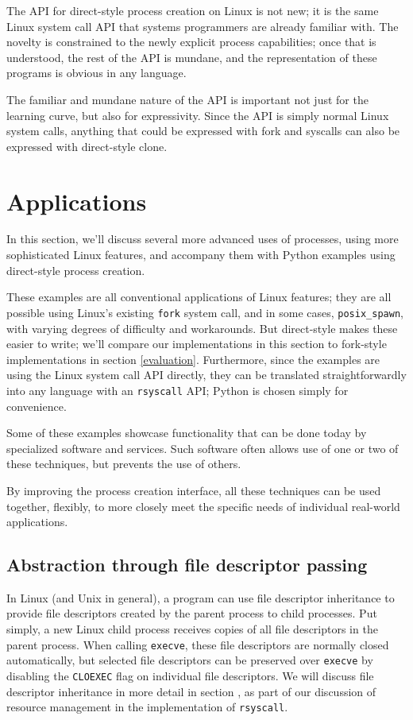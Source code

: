 \documentclass{acmart}
\begin{document}
The API for direct-style process creation on Linux is not new;
it is the same Linux system call API that systems programmers are already familiar with.
The novelty is constrained to the newly explicit process capabilities;
once that is understood, the rest of the API is mundane,
and the representation of these programs is obvious in any language.

The familiar and mundane nature of the API is important not just for the learning curve,
but also for expressivity.
Since the API is simply normal Linux system calls,
anything that could be expressed with fork and syscalls
can also be expressed with direct-style clone.
\section{Applications}
In this section,
we'll discuss several more advanced uses of processes,
using more sophisticated Linux features,
and accompany them with Python examples using direct-style process creation.

These examples are all conventional applications of Linux features;
they are all possible using Linux's existing \texttt{fork} system call,
and in some cases, \verb|posix_spawn|,
with varying degrees of difficulty and workarounds.
But direct-style makes these easier to write;
we'll compare our implementations in this section to fork-style implementations in section \ref{evaluation}.
Furthermore, since the examples are using the Linux system call API directly,
they can be translated straightforwardly into any language with an \texttt{rsyscall} API;
Python is chosen simply for convenience.

Some of these examples showcase functionality that can be done today by specialized software and services.
Such software often allows use of one or two of these techniques, but prevents the use of others.

By improving the process creation interface,
all these techniques can be used together, flexibly,
to more closely meet the specific needs of individual real-world applications.

\subsection{Abstraction through file descriptor passing}\label{fd_abstraction}
In Linux (and Unix in general),
a program can use file descriptor inheritance
to provide file descriptors created by the parent process to child processes.
Put simply,
a new Linux child process receives copies of all file descriptors in the parent process.
When calling \texttt{execve}, these file descriptors are normally closed automatically,
but selected file descriptors can be preserved over \texttt{execve}
by disabling the \texttt{CLOEXEC} flag on individual file descriptors.
We will discuss file descriptor inheritance in more detail in section \label{fdtables},
as part of our discussion of resource management in the implementation of \texttt{rsyscall}.
\end{document}
